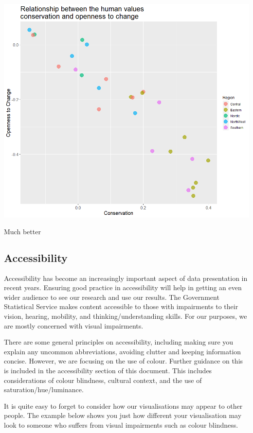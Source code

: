 \documentclass[
]{book}
\begin{document}
\includegraphics[width=13.28in]{img/not too much man}

Much better

\hypertarget{accessibility}{%
\subsection{Accessibility}\label{accessibility}}

Accessibility has become an increasingly important aspect of data presentation in recent years. Ensuring good practice in accessibility will help in getting an even wider audience to see our research and use our results. The Government Statistical Service makes content accessible to those with impairments to their vision, hearing, mobility, and thinking/understanding skills. For our purposes, we are mostly concerned with visual impairments.

There are some general principles on accessibility, including making sure you explain any uncommon abbreviations, avoiding clutter and keeping information concise. However, we are focusing on the use of colour. Further guidance on this is included in the accessibility section of this document. This includes considerations of colour blindness, cultural context, and the use of saturation/hue/luminance.

It is quite easy to forget to consider how our visualisations may appear to other people. The example below shows you just how different your visualisation may look to someone who suffers from visual impairments such as colour blindness.
\end{document}
